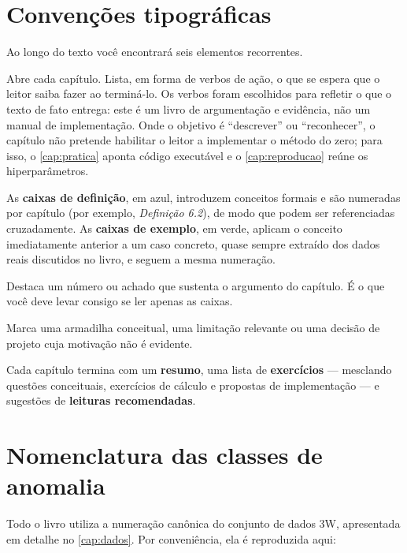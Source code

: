 \section*{Convenções tipográficas}

Ao longo do texto você encontrará seis elementos recorrentes.

\begin{objetivos}
Abre cada capítulo. Lista, em forma de verbos de ação, o que se espera que o leitor
saiba fazer ao terminá-lo. Os verbos foram escolhidos para refletir o que o texto de
fato entrega: este é um livro de argumentação e evidência, não um manual de
implementação. Onde o objetivo é ``descrever'' ou ``reconhecer'', o capítulo não
pretende habilitar o leitor a implementar o método do zero; para isso, o
\cref{cap:pratica} aponta código executável e o \cref{cap:reproducao} reúne os
hiperparâmetros.
\end{objetivos}

\medskip
\noindent
As \textbf{caixas de definição}, em azul, introduzem conceitos formais e são numeradas
por capítulo (por exemplo, \emph{Definição 6.2}), de modo que podem ser referenciadas
cruzadamente. As \textbf{caixas de exemplo}, em verde, aplicam o conceito imediatamente
anterior a um caso concreto, quase sempre extraído dos dados reais discutidos no livro,
e seguem a mesma numeração.

\begin{resultadochave}
Destaca um número ou achado que sustenta o argumento do capítulo. É o que você deve
levar consigo se ler apenas as caixas.
\end{resultadochave}

\begin{destaque}
Marca uma armadilha conceitual, uma limitação relevante ou uma decisão de projeto cuja
motivação não é evidente.
\end{destaque}

\medskip
\noindent
Cada capítulo termina com um \textbf{resumo}, uma lista de \textbf{exercícios} ---
mesclando questões conceituais, exercícios de cálculo e propostas de implementação ---
e sugestões de \textbf{leituras recomendadas}.


\section*{Nomenclatura das classes de anomalia}

Todo o livro utiliza a numeração canônica do conjunto de dados 3W, apresentada em
detalhe no \cref{cap:dados}. Por conveniência, ela é reproduzida aqui:

